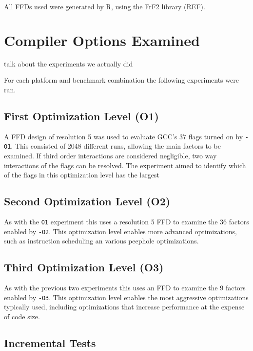 \documentclass[twocolumn]{article}
\begin{document}


All FFDs used were generated by R, using the FrF2 library (REF).

\section*{Compiler Options Examined}

talk about the experiments we actually did

For each platform and benchmark combination the following experiments were ran.

\subsection*{First Optimization Level (O1)}

A FFD design of resolution 5 was used to evaluate GCC's 37 flags turned on by \texttt{-O1}. This consisted of 2048 different runs, allowing the main factors to be examined. If third order interactions are considered negligible, two way interactions of the flags can be resolved. The experiment aimed to identify which of the flags in this optimization level has the largest

\subsection*{Second Optimization Level (O2)}

As with the \texttt{O1} experiment this uses a resolution 5 FFD to examine the 36 factors enabled by \texttt{-O2}. This optimization level enables more advanced optimizations, such as instruction scheduling an various peephole optimizations.

\subsection*{Third Optimization Level (O3)}

As with the previous two experiments this uses an FFD to examine the 9 factors enabled by \texttt{-O3}. This optimization level enables the most aggressive optimizations typically used, including optimizations that increase performance at the expense of code size.

\subsection*{Incremental Tests}
\end{document}
